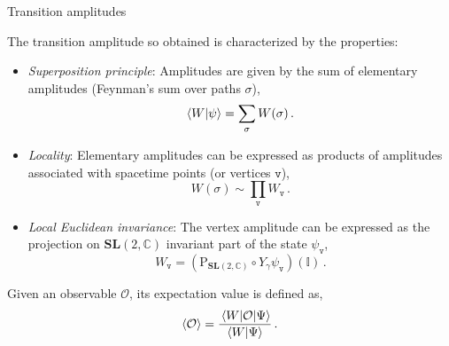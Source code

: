 \documentclass{beamer}
\newcommand\italictext[1]{\textcolor{italics}{\textit{#1}}}
\begin{document}
\begin{frame}{Transition amplitudes}
    \begin{list}{\maltese}{\leftmargin=1em \itemindent=0em}
        \item<1-> The transition amplitude so obtained is characterized by the properties:
        \begin{itemize}
            \item<1-> \italictext{Superposition principle}: Amplitudes are given by the sum of elementary amplitudes (Feynman's sum over paths $\sigma$),
            \begin{equation}
                \braket{W}{\psi}=\sum_\sigma W(\sigma)\,.
            \end{equation}
            \item<2-> \italictext{Locality}: Elementary amplitudes can be expressed as products of amplitudes associated with spacetime points (or vertices $\mathtt{v}$),
            \begin{equation}
                W(\sigma)\sim\prod_\mathtt{v}W_\mathtt{v}\,.
            \end{equation}
            \item<3-> \italictext{Local Euclidean invariance}: The vertex amplitude can be expressed as the projection on $\mathbf{SL}(2,\mathbb{C})$ invariant part of the state $\psi_\mathtt{v}$,
            \begin{equation}
                W_\mathtt{v}=(\operatorname{P_{\mathbf{SL}(2,\mathbb{C})}}\circ Y_\gamma\psi_\mathtt{v})(\mathbb{I})\,.
            \end{equation}
        \end{itemize}
        \item<4-> \vspace{-10pt}Given an observable $\mathcal{O}$, its expectation value is defined as,
        \begin{equation}
            \expval{\mathcal{O}}=\frac{\mel{W}{\mathcal{O}}{\Psi}}{\braket{W}{\Psi}}\,.
        \end{equation}
    \end{list}
\end{frame}
\end{document}
